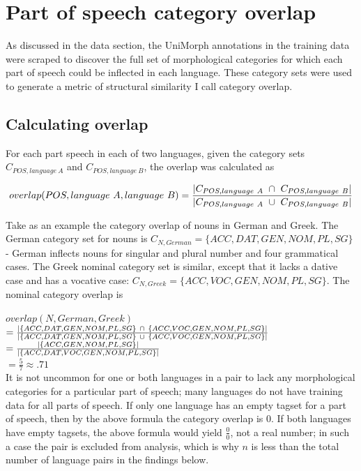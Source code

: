 \section{Part of speech category overlap}

As discussed in the data section, the UniMorph annotations in the training data were scraped to discover the full set of morphological categories for which each part of speech could be inflected in each language. These category sets were used to generate a metric of structural similarity I call category overlap.

\subsection{Calculating overlap}

For each part speech in each of two languages, given the category sets $C_{POS, language\ A}$ and $C_{POS, language\ B}$, the overlap was calculated as

\[overlap(POS, language\ A, language\ B) = \frac{\abs*{C_{POS, language\ A}\ \cap\ C_{POS, language\ B}}}{\abs*{C_{POS, language\ A}\ \cup\ C_{POS, language\ B}}}\]

Take as an example the category overlap of nouns in German and Greek. The German category set for nouns is $C_{N,German} = \{ACC, DAT, GEN, NOM, PL, SG\}$ - German inflects nouns for singular and plural number and four grammatical cases. The Greek nominal category set is similar, except that it lacks a dative case and has a vocative case: $C_{N,Greek} = \{ACC, VOC, GEN, NOM, PL, SG\}$. The nominal category overlap is 

$overlap(N, German, Greek)$\\
$= \frac{\abs*{\{ACC, DAT, GEN, NOM, PL, SG\}\ \cap\ \{ACC, VOC, GEN, NOM, PL, SG\}}}{\abs*{\{ACC, DAT, GEN, NOM, PL, SG\}\ \cup\ \{ACC, VOC, GEN, NOM, PL, SG\}}}$\\
$= \frac{\abs*{\{ACC, GEN, NOM, PL, SG\}}}{\abs*{\{ACC, DAT, VOC, GEN, NOM, PL, SG\}}}$\\
$= \frac{5}{7} \approx .71$\\

It is not uncommon for one or both languages in a pair to lack any morphological categories for a particular part of speech; many languages do not have training data for all parts of speech. If only one language has an empty tagset for a part of speech, then by the above formula the category overlap is 0. If both languages have empty tagsets, the above formula would yield $\frac{0}{0}$, not a real number; in such a case the pair is excluded from analysis, which is why $n$ is less than the total number of language pairs in the findings below.

